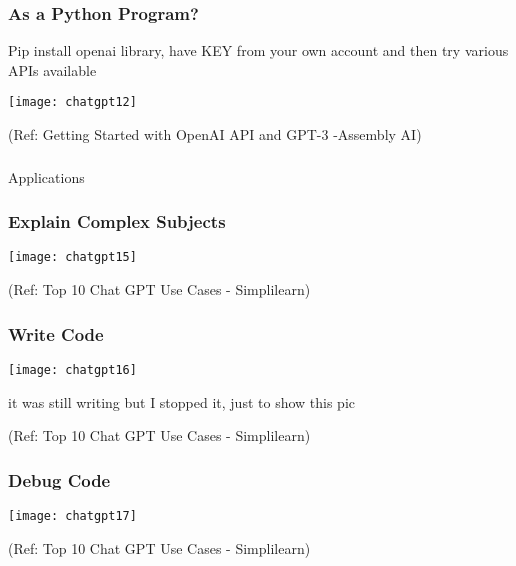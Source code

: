 \begin{frame}[fragile]\frametitle{As a Python Program?}
Pip install openai library, have KEY from your own account and then try various APIs available

			\begin{center}
			\texttt{[image: chatgpt12]}
			
			\end{center}		
			
			{\tiny (Ref: Getting Started with OpenAI API and GPT-3 -Assembly AI)}
			

\end{frame}

\begin{frame}[fragile]\frametitle{}
\begin{center}
{\Large Applications}
\end{center}
\end{frame}




\begin{frame}[fragile]\frametitle{Explain Complex Subjects}
\begin{center}
\texttt{[image: chatgpt15]}
\end{center}
	
{\tiny (Ref: Top 10 Chat GPT Use Cases - Simplilearn)}
\end{frame}

\begin{frame}[fragile]\frametitle{Write Code}
\begin{center}
\texttt{[image: chatgpt16]}
\end{center}

it was still writing but I stopped it, just to show this pic

{\tiny (Ref: Top 10 Chat GPT Use Cases - Simplilearn)}
\end{frame}

\begin{frame}[fragile]\frametitle{Debug Code}
\begin{center}
\texttt{[image: chatgpt17]}
\end{center}

{\tiny (Ref: Top 10 Chat GPT Use Cases - Simplilearn)}
\end{frame}

